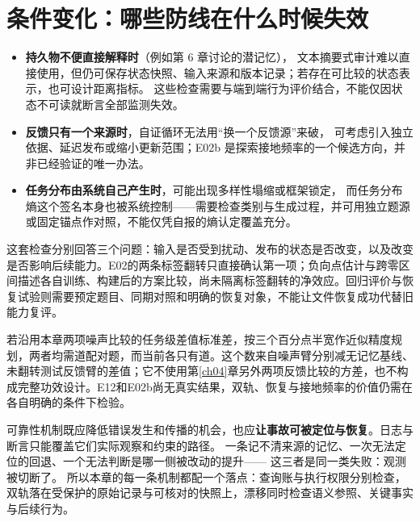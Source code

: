 \section{条件变化：哪些防线在什么时候失效}
\label{sec:ch14-conditions}

\begin{itemize}
  \item \textbf{持久物不便直接解释时}（例如第 6 章讨论的潜记忆），
        文本摘要式审计难以直接使用，但仍可保存状态快照、输入来源和版本记录；若存在可比较的状态表示，也可设计距离指标。
        这些检查需要与端到端行为评价结合，不能仅因状态不可读就断言全部监测失效。
  \item \textbf{反馈只有一个来源时}，自证循环无法用“换一个反馈源”来破，
        可考虑引入独立依据、延迟发布或缩小更新范围；E02b 是探索接地频率的一个候选方向，并非已经验证的唯一办法。
  \item \textbf{任务分布由系统自己产生时}，可能出现多样性塌缩或框架锁定，
        而任务分布熵这个签名本身也被系统控制——需要检查类别与生成过程，并可用独立题源或固定锚点作对照，不能仅凭自报的熵认定覆盖充分。
\end{itemize}

\label{sec:ch14-claims}

这套检查分别回答三个问题：输入是否受到扰动、发布的状态是否改变，以及改变是否影响后续能力。E02的两条标签翻转只直接确认第一项；负向点估计与跨零区间描述各自训练、构建后的方案比较，尚未隔离标签翻转的净效应。回归评价与恢复试验则需要预定题目、同期对照和明确的恢复对象，不能让文件恢复成功代替旧能力复评。

若沿用本章两项噪声比较的任务级差值标准差，按三个百分点半宽作近似精度规划，两者均需道配对题，而当前各只有道。这个数来自噪声臂分别减无记忆基线、未翻转测试反馈臂的差值；它不使用第\ref{ch04}章另外两项反馈比较的方差，也不构成完整功效设计。E12和E02b尚无真实结果，双轨、恢复与接地频率的价值仍需在各自明确的条件下检验。

\begin{principlebox}
可靠性机制既应降低错误发生和传播的机会，也应\textbf{让事故可被定位与恢复}。日志与断言只能覆盖它们实际观察和约束的路径。
一条记不清来源的记忆、一次无法定位的回退、一个无法判断是哪一侧被改动的提升——
这三者是同一类失败：观测被切断了。
所以本章的每一条机制都配一个落点：查询账与执行权限分别检查，
双轨落在受保护的原始记录与可核对的快照上，漂移同时检查语义参照、关键事实与后续行为。
\end{principlebox}


